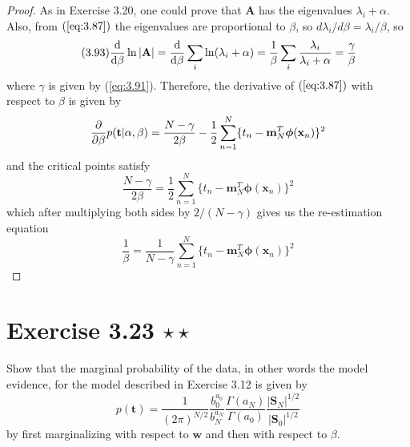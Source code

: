 \begin{proof}
   As in Exercise 3.20, one could prove that $\mathbf{A}$ has the eigenvalues
   $\lambda_i + \alpha$. Also, from $(\ref{eq:3.87})$ the eigenvalues are proportional
   to $\beta$, so $d\lambda_i / d\beta = \lambda_i/\beta$, so
   \begin{equation}\label{eq:3.93}\tag{3.93}
       \dv{\beta} \ln |\mathbf{A}| = \dv{\beta} \sum_i \ln (\lambda_i + \alpha)
       = \frac{1}{\beta} \sum_i \frac{\lambda_i}{\lambda_i + \alpha}
       = \frac{\gamma}{\beta}
   \end{equation}
   where $\gamma$ is given by (\ref{eq:3.91}). Therefore, 
   the derivative of $(\ref{eq:3.87})$ with respect to $\beta$ is given by 
   \[
       \pdv{\beta} p(\mathbf{t} | \alpha, \beta)
       = \frac{N - \gamma}{2\beta} 
       - \frac{1}{2} \sum_{n=1}^{N}\{t_n - \mathbf{m}_N^T\bm{\phi}(\mathbf{x}_n)\}^2
   \] 
   and the critical points satisfy
   \[
       \frac{N - \gamma}{2\beta} =
       \frac{1}{2} \sum_{n=1}^{N}\{t_n - \mathbf{m}_N^T\bm{\phi}(\mathbf{x}_n)\}^2
   \] 
   which after multiplying both sides by $2/(N - \gamma)$ gives 
   us the re-estimation equation
   \begin{equation}\label{eq:3.95}\tag{3.95}
       \frac{1}{\beta} = \frac{1}{N - \gamma} \sum_{n=1}^{N} 
       \{t_n - \mathbf{m}_N^T\bm{\phi}(\mathbf{x}_n)\}^2
   \end{equation}
\end{proof}

\section*{Exercise 3.23 $\star \star$}
Show that the marginal probability of the data, in other words the model
evidence, for the model described in Exercise 3.12 is given by
\begin{equation}\label{eq:3.118}\tag{3.118}
    p(\mathbf{t}) = \frac{1}{(2\pi)^{N / 2}} \frac{b_0^{a_0}}{b_N^{a_N}}
    \frac{\Gamma(a_N)}{\Gamma(a_0)} \frac{|\mathbf{S}_N|^{1/2}}{|\mathbf{S}_0|^{1/2}}
\end{equation}
by first marginalizing with respect to $\mathbf{w}$ and then with
respect to $\beta$.

\vspace{1em}

